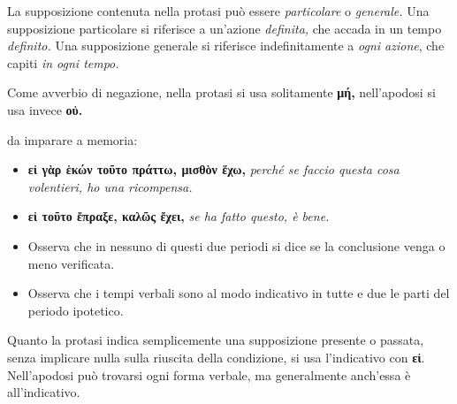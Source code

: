 \documentclass[nols]{tufte-handout}
\newcommand{\textls}[2][5]{%
    \begingroup\addfontfeatures{LetterSpace=#1}#2\endgroup
  }
\renewcommand{\smallcapsspacing}[1]{\textls[10]{#1}}
\renewcommand{\textsc}[1]{\smallcapsspacing{\textsmallcaps{#1}}}
\begin{document}
 La supposizione contenuta nella protasi può essere \textit{particolare} o \textit{generale.} 
Una supposizione particolare si riferisce a un'azione \textit{definita,} che accada in un tempo \textit{definito.}
Una supposizione generale si riferisce indefinitamente a \textit{ogni azione}, che capiti \textit{in ogni tempo.}

 Come avverbio di negazione, nella protasi si usa solitamente \textbf{μή,} nell'apodosi si usa invece \textbf{οὐ.} 

 da imparare a memoria:
\begin{itemize}
\item[\textsc{a.}] \textbf{εἰ γὰρ ἑκών τοῦτο πράττω, μισθὸν ἕχω,} \textit{perché se faccio questa cosa volentieri, ho una ricompensa.}
\item[\textsc{b.}] \textbf{εἰ τοῦτο ἔπραξε, καλῶς ἔχει,} \textit{se ha fatto questo, è bene.}
\item[\textsc{1.}] Osserva che in nessuno di questi due periodi si dice se la conclusione venga o meno verificata.
\item[\textsc{2.}] Osserva che i tempi verbali sono al modo indicativo in tutte e due le parti del periodo ipotetico.
\end{itemize} 

 Quanto la protasi indica semplicemente una supposizione presente o passata, senza implicare nulla sulla riuscita
della condizione, si usa l'indicativo con \textbf{εἰ}. Nell'apodosi può trovarsi ogni forma verbale, ma generalmente anch'essa è all'indicativo. 

\newpage

\end{document}

